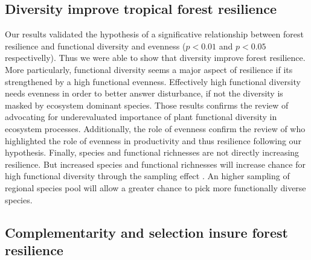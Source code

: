 \documentclass[12pt,]{article}
\theoremstyle{definition}
\theoremstyle{definition}
\theoremstyle{remark}
\begin{document}
\subsection{Diversity improve tropical forest
resilience}\label{diversity-improve-tropical-forest-resilience}

Our results validated the hypothesis of a significative relationship
between forest resilience and functional diversity and evenness
(\(p < 0.01\) and \(p < 0.05\) respectivelly). Thus we were able to show
that diversity improve forest resilience. More particularly, functional
diversity seems a major aspect of resilience if its strengthened by a
high functional evenness. Effectively high functional diversity needs
evenness in order to better answer disturbance, if not the diversity is
masked by ecosystem dominant species. Those results confirms the review
of \citet{Diaz2001} advocating for underevaluated importance of plant
functional diversity in ecosystem processes. Additionally, the role of
evenness confirm the review of \citet{Zhang2012} who highlighted the
role of evenness in productivity and thus resilience following our
hypothesis. Finally, species and functional richnesses are not directly
increasing resilience. But increased species and functional richnesses
will increase chance for high functional diversity through the sampling
effect \citep{Loreau1998}. An higher sampling of regional species pool
will allow a greater chance to pick more functionally diverse species.

\subsection{Complementarity and selection insure forest
resilience}\label{complementarity-and-selection-insure-forest-resilience}
\end{document}
